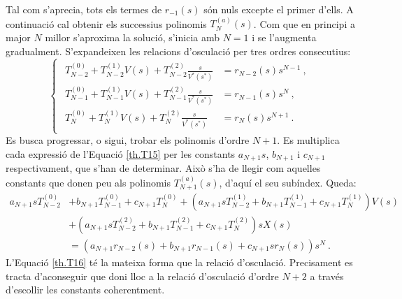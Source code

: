 Tal com s'aprecia, tots els termes de $r_{-1}(s)$ són nuls excepte el primer d'ells. A continuació cal obtenir els successius polinomis $T^{(a)}_N(s)$. Com que en principi a major $N$ millor s'aproxima la solució, s'inicia amb $N=1$ i se l'augmenta gradualment. S'expandeixen les relacions d'osculació per tres ordres consecutius:
\begin{equation}
    \begin{cases}
\begin{split}
T^{(0)}_{N-2}+T^{(1)}_{N-2}V(s)+T^{(2)}_{N-2}\frac{s}{V^*(s^*)}&=r_{N-2}(s)s^{N-1}\ ,\\
T^{(0)}_{N-1}+T^{(1)}_{N-1}V(s)+T^{(2)}_{N-1}\frac{s}{V^*(s^*)}&=r_{N-1}(s)s^{N}\ ,\\
T^{(0)}_{N}+T^{(1)}_{N}V(s)+T^{(2)}_{N}\frac{s}{V^*(s^*)}&=r_{N}(s)s^{N+1}\ .
\end{split}
\end{cases}
\label{th.T15}
\end{equation}
Es busca progressar, o sigui, trobar els polinomis d'ordre $N+1$. Es multiplica cada expressió de l'Equació \ref{th.T15} per les constants $a_{N+1}s$, $b_{N+1}$ i $c_{N+1}$ respectivament, que s'han de determinar. Això s'ha de llegir com aquelles constants que donen peu als polinomis  $T^{(a)}_{N+1}(s)$, d'aquí el seu subíndex. Queda:
\begin{equation}
\begin{split}
a_{N+1}sT^{(0)}_{N-2}&+b_{N+1}T^{(0)}_{N-1}+c_{N+1}T^{(0)}_{N}
+(a_{N+1}sT^{(1)}_{N-2}+b_{N+1}T^{(1)}_{N-1}+c_{N+1}T^{(1)}_{N})V(s)\\
&+(a_{N+1}sT^{(2)}_{N-2}+b_{N+1}T^{(2)}_{N-1}+c_{N+1}T^{(2)}_{N})sX(s)\\
&=(a_{N+1}r_{N-2}(s)+b_{N+1}r_{N-1}(s)+c_{N+1}sr_{N}(s))s^N\ .
\end{split}
\label{th.T16}
\end{equation}
L'Equació \ref{th.T16} té la mateixa forma que la relació d'osculació. Precisament es tracta d'aconseguir que doni lloc a la relació d'osculació d'ordre $N+2$ a través d'escollir les constants coherentment. 

